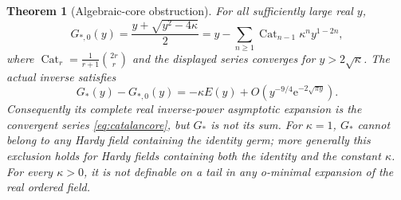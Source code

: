 \documentclass[11pt,a4paper]{article}
\newtheorem{theorem}{Theorem}[section]
\theoremstyle{definition}
\theoremstyle{remark}
\newcommand{\e}{\mathrm e}
\numberwithin{equation}{section}
\begin{document}
\begin{theorem}[Algebraic-core obstruction]\label{thm:catalan}
For all sufficiently large real $y$,
\begin{equation}\label{eq:catalancore}
 G_{*,0}(y)=\frac{y+\sqrt{y^2-4\kappa}}2
 =y-\sum_{n\ge1}\operatorname{Cat}_{n-1}\kappa^n y^{1-2n},
\end{equation}
where $\operatorname{Cat}_r=\frac1{r+1}\binom{2r}{r}$ and the displayed series converges for $y>2\sqrt\kappa$. The actual inverse satisfies
\begin{equation}\label{eq:zerogapdifference}
 G_*(y)-G_{*,0}(y)
 =-\kappa E(y)+O\left(y^{-9/4}\e^{-2\sqrt{\pi y}}\right).
\end{equation}
Consequently its complete real inverse-power asymptotic expansion is the convergent series \eqref{eq:catalancore}, but $G_*$ is not its sum. For $\kappa=1$, $G_*$ cannot belong to any Hardy field containing the identity germ; more generally this exclusion holds for Hardy fields containing both the identity and the constant $\kappa$. For every $\kappa>0$, it is not definable on a tail in any o-minimal expansion of the real ordered field.
\end{theorem}
\end{document}
